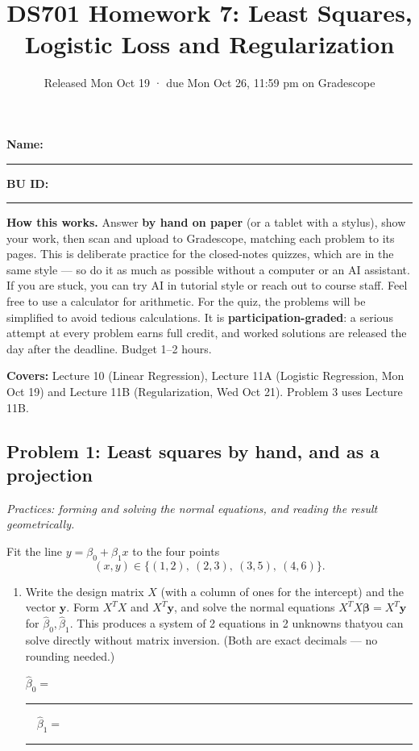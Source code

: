 \documentclass[
  11pt,
]{article}
\title{DS701 Homework 7: Least Squares, Logistic Loss and
Regularization}
\subtitle{Released Mon Oct 19 · due Mon Oct 26, 11:59 pm on Gradescope}
\author{}
\date{}
\newcommand{\blank}[1][1.2in]{\rule{#1}{0.4pt}}
\newcommand{\answerpage}{\clearpage}
\begin{document}
\maketitle


\noindent\textbf{Name:}\ \rule{2.0in}{0.4pt}\qquad\textbf{BU ID:}\ \rule{1.2in}{0.4pt}
\vspace{6pt}

\textbf{How this works.} Answer \textbf{by hand on paper} (or a tablet
with a stylus), show your work, then scan and upload to Gradescope,
matching each problem to its pages. This is deliberate practice for the
closed-notes quizzes, which are in the same style --- so do it as much
as possible without a computer or an AI assistant. If you are stuck, you
can try AI in tutorial style or reach out to course staff. Feel free to
use a calculator for arithmetic. For the quiz, the problems will be
simplified to avoid tedious calculations. It is
\textbf{participation-graded}: a serious attempt at every problem earns
full credit, and worked solutions are released the day after the
deadline. Budget 1--2 hours.

\textbf{Covers:} Lecture 10 (Linear Regression), Lecture 11A (Logistic
Regression, Mon Oct 19) and Lecture 11B (Regularization, Wed Oct 21).
Problem 3 uses Lecture 11B.

\answerpage

\subsection{Problem 1: Least squares by hand, and as a
projection}\label{problem-1-least-squares-by-hand-and-as-a-projection}

\emph{Practices: forming and solving the normal equations, and reading
the result geometrically.}

Fit the line \(y = \beta_0 + \beta_1 x\) to the four points
\[(x, y) \in \{(1, 2),\ (2, 3),\ (3, 5),\ (4, 6)\}.\]

\begin{enumerate}
\def\labelenumi{(\alph{enumi})}
\item
  Write the design matrix \(X\) (with a column of ones for the
  intercept) and the vector \(\mathbf{y}\). Form \(X^TX\) and
  \(X^T\mathbf{y}\), and solve the normal equations
  \(X^TX\boldsymbol\beta = X^T\mathbf{y}\) for
  \(\hat\beta_0, \hat\beta_1\). This produces a system of 2 equations in
  2 unknowns thatyou can solve directly without matrix inversion. (Both
  are exact decimals --- no rounding needed.)

  \(\hat\beta_0 =\) \blank[0.8in] \(\quad \hat\beta_1 =\) \blank[0.8in]
\end{enumerate}
\end{document}
